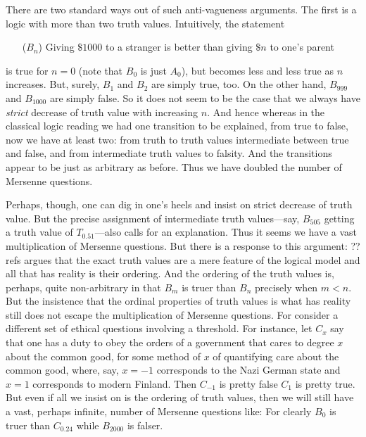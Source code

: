 There are two standard ways out of such anti-vagueness arguments. The first is a logic with more than two truth values. Intuitively, the statement 
\begin{itemize}
\item[($B_n$)] Giving $ \$1000$ to a stranger is better than giving $ \$n$ to one's parent 
\end{itemize}
is true for $n=0$ (note that $B_0$ is just $A_0$), but becomes less and less true as $n$ increases. 
But, surely, $B_1$ and $B_2$ are simply true, too. On the other hand, $B_{999}$ and $B_{1000}$ are simply false. So it does not seem to be the case
that we always have \textit{strict} decrease of truth value with increasing $n$. And hence whereas in the
classical logic reading we had one transition to be explained, from true to false, now we have at least two: from truth to truth values intermediate
between true and false, and from intermediate truth values to falsity. And the transitions appear to be just as arbitrary as before. Thus we have doubled 
the number of Mersenne questions.

Perhaps, though, one can dig in one's heels and insist on strict decrease of truth value. But the precise assignment of 
intermediate truth values---say, $B_{505}$ getting a truth value of $T_{0.51}$---also calls for an explanation. Thus it seems we have a vast multiplication
of Mersenne questions. But there is a response to this argument: ??refs argues that 
the exact truth values are a mere feature of the logical model and all that has reality is their ordering. And
the ordering of the truth values is, perhaps, quite non-arbitrary in that $B_{m}$ is truer than $B_n$ precisely when $m<n$. But the insistence that the ordinal
properties of truth values is what has reality still does not escape the multiplication of Mersenne questions. For consider a different set of ethical
questions involving a threshold. For instance, let $C_x$ say that one has a duty to obey the orders of a government that cares to degree $x$ about the common
good, for some method of $x$ of quantifying care about the common good, where, say, $x=-1$ corresponds to the Nazi German state and $x=1$ corresponds to modern
Finland. Then $C_{-1}$ is pretty false $C_1$ is pretty true. But even if all we insist on is the ordering of truth values, then we will still have a vast,
perhaps infinite, number of Mersenne  questions like: 
For clearly $B_0$ is truer than $C_{0.24}$ while $B_{2000}$ is falser.

